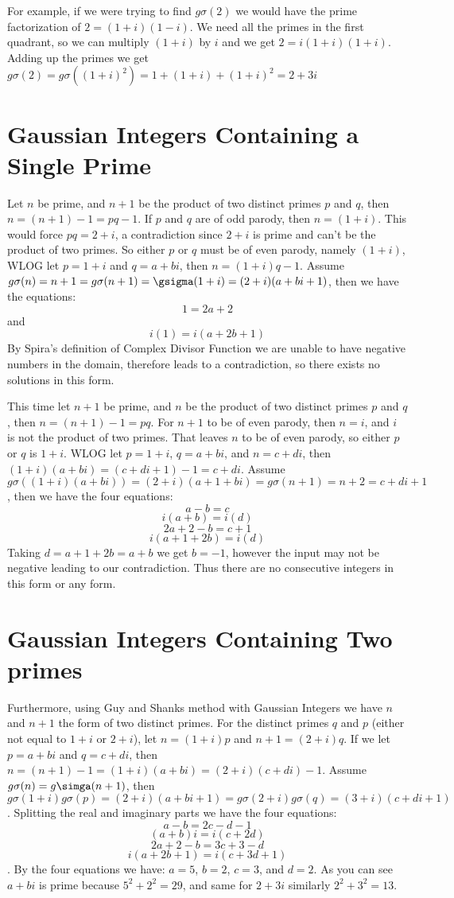 \documentclass[12pt]{amsart}
\begin{document}
For example, if we were trying to find $g\sigma(2)$ we would have the prime factorization of $2 = (1+i)(1-i)$. We need all the primes in the first quadrant, so we can multiply $(1+i)$ by $i$ and we get $2 = i(1+i)(1+i)$. Adding up the primes we get $g\sigma(2) = g\sigma((1+i)^2) = 1 + (1+i) + (1+i)^2 = 2 + 3i$

\section{Gaussian Integers Containing a Single Prime}
Let $n$ be prime, and $n+1$ be the product of two distinct primes $p$ and $q$, then $n = (n + 1) - 1 = pq - 1$. If $p$ and $q$ are of odd parody, then $n = (1+i)$. This would force $pq = 2+i$, a contradiction since $2+i$ is prime and can't be the product of two primes. So either $p$ or $q$ must be of even parody, namely $(1+i)$, WLOG let $p = 1 + i$ and $q=a + bi$, then $n = (1+i)q - 1$. Assume $g\sigma(n) = n+1 = g\sigma(n+1) = \gsigma(1+i) = (2+i)(a + bi +1)$, then we have the equations: $$1 = 2a + 2$$ and $$i(1) = i(a + 2b + 1)$$By Spira's definition of Complex Divisor Function we are unable to have negative numbers in the domain, therefore leads to a contradiction, so there exists no solutions in this form.

This time let $n+1$ be prime, and $n$ be the product of two distinct primes $p$ and $q$, then $n = (n+1) -1 = pq$. For $n+1$ to be of even parody, then $n = i$, and $i$ is not the product of two primes. That leaves $n$ to be of even parody, so either $p$ or $q$ is $1+i$. WLOG let $p=1+i$, $q=a+bi$, and $n = c + di$, then $(1+i)(a+bi) = (c + di+1) - 1 = c + di$. Assume $g\sigma((1+i)(a+bi)) = (2+i)(a+1+bi) = g\sigma(n+1) = n + 2 = c + di + 1$, then we have the four equations:
$$a -b = c$$ $$i(a + b) = i(d)$$ $$2a + 2 -b = c + 1$$ $$i(a + 1 + 2b) = i(d)$$ Taking $d = a + 1 + 2b = a + b$ we get $b = -1$, however the input may not be negative leading to our contradiction. Thus there are no consecutive integers in this form or any form.
\\
\section{Gaussian Integers Containing Two primes}
Furthermore, using Guy and Shanks method with Gaussian Integers we have $n$ and $n+1$ the form of two distinct primes. For the distinct primes $q$ and $p$ (either not equal to $1+i$ or $2+i$), let $n = (1+i)p$ and $n+1 = (2+i)q$. If we let $p = a+bi$ and $q=c+di$, then $n = (n + 1) - 1 = (1+i)(a+bi) = (2+i)(c+di) - 1$.  Assume $g\sigma(n) = g\simga(n+1)$, then $g\sigma(1+i)g\sigma(p) = (2+i)(a + bi + 1) = g\sigma(2+i)g\sigma(q) = (3+i)(c+di+1)$. Splitting the real and imaginary parts we have the four equations: $$ a -b = 2c - d - 1$$ $$(a + b)i = i(c + 2d)$$ $$2a + 2 -b = 3c + 3 - d$$ $$i(a +2b + 1) = i(c + 3d + 1)$$. By the four equations we have: $a = 5$, $b=2$, $c = 3$, and $d = 2$. As you can see $a+bi$ is prime because $5^2 + 2^2 = 29$, and same for $2+3i$ similarly $2^2 + 3^2 = 13$.
\\
\end{document}
